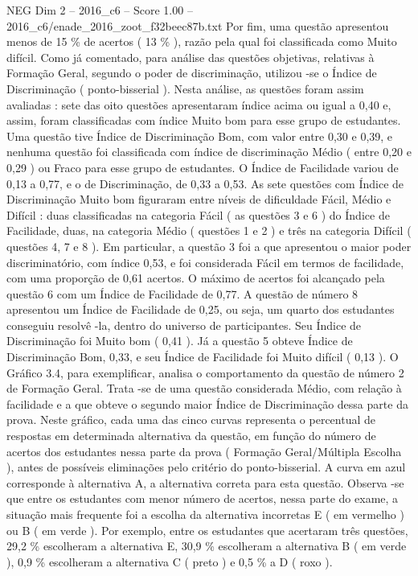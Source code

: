 \begin{textsample}{NEG Dim 2 – 2016\_c6 – Score 1.00 – 2016\_c6/enade\_2016\_zoot\_f32beec87b.txt}
Por fim, uma questão apresentou menos de 15 \% de acertos ( 13 \% ), razão pela qual foi classificada como Muito difícil.
Como já comentado, para análise das questões objetivas, relativas à Formação Geral, segundo o poder de discriminação, utilizou -se o Índice de Discriminação ( ponto-bisserial ).
Nesta análise, as questões foram assim avaliadas : sete das oito questões apresentaram índice acima ou igual a 0,40 e, assim, foram classificadas com índice Muito bom para esse grupo de estudantes.
Uma questão tive Índice de Discriminação Bom, com valor entre 0,30 e 0,39, e nenhuma questão foi classificada com índice de discriminação Médio ( entre 0,20 e 0,29 ) ou Fraco para esse grupo de estudantes.
O Índice de Facilidade variou de 0,13 a 0,77, e o de Discriminação, de 0,33 a 0,53.
As sete questões com Índice de Discriminação Muito bom figuraram entre níveis de dificuldade Fácil, Médio e Difícil : duas classificadas na categoria Fácil ( as questões 3 e 6 ) do Índice de Facilidade, duas, na categoria Médio ( questões 1 e 2 ) e três na categoria Difícil ( questões 4, 7 e 8 ).
Em particular, a questão 3 foi a que apresentou o maior poder discriminatório, com índice 0,53, e foi considerada Fácil em termos de facilidade, com uma proporção de 0,61 acertos.
O máximo de acertos foi alcançado pela questão 6 com um Índice de Facilidade de 0,77.
A questão de número 8 apresentou um Índice de Facilidade de 0,25, ou seja, um quarto dos estudantes conseguiu resolvê -la, dentro do universo de participantes.
Seu Índice de Discriminação foi Muito bom ( 0,41 ).
Já a questão 5 obteve Índice de Discriminação Bom, 0,33, e seu Índice de Facilidade foi Muito difícil ( 0,13 ).
O Gráfico 3.4, para exemplificar, analisa o comportamento da questão de número 2 de Formação Geral.
Trata -se de uma questão considerada Médio, com relação à facilidade e a que obteve o segundo maior Índice de Discriminação dessa parte da prova.
Neste gráfico, cada uma das cinco curvas representa o percentual de respostas em determinada alternativa da questão, em função do número de acertos dos estudantes nessa parte da prova ( Formação Geral/Múltipla Escolha ), antes de possíveis eliminações pelo critério do ponto-bisserial.
A curva em azul corresponde à alternativa A, a alternativa correta para esta questão.
Observa -se que entre os estudantes com menor número de acertos, nessa parte do exame, a situação mais frequente foi a escolha da alternativa incorretas E ( em vermelho ) ou B ( em verde ).
Por exemplo, entre os estudantes que acertaram três questões, 29,2 \% escolheram a alternativa E, 30,9 \% escolheram a alternativa B ( em verde ), 0,9 \% escolheram a alternativa C ( preto ) e 0,5 \% a D ( roxo ).

\end{textsample}
